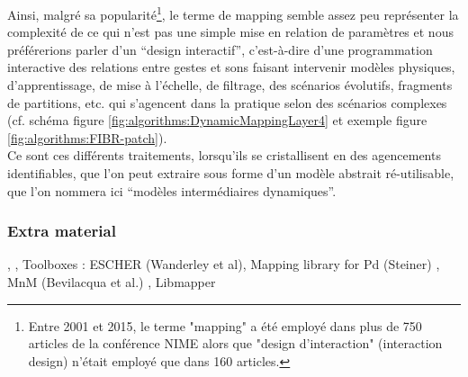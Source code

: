 \indent Ainsi, malgré sa popularité\footnote{Entre 2001 et 2015, le terme "mapping" a été employé dans plus de 750 articles de la conférence \gls{NIME} alors que "design d'interaction" (interaction design) n'était employé que dans 160 articles.}, le terme de mapping semble assez peu représenter la complexité de ce qui n'est pas une simple mise en relation de paramètres et nous préférerions parler d'un ``design interactif'', c'est-à-dire d'une programmation interactive des relations entre gestes et sons faisant intervenir modèles physiques, d'apprentissage, de mise à l'échelle, de filtrage, des scénarios évolutifs, fragments de partitions, etc. qui s'agencent dans la pratique selon des scénarios complexes (cf. schéma figure \ref{fig:algorithms:DynamicMappingLayer4} et exemple figure \ref{fig:algorithms:FIBR-patch}).\\
\noindent Ce sont ces différents traitements, lorsqu'ils se cristallisent en des agencements identifiables, que l'on peut extraire sous forme d'un modèle abstrait ré-utilisable, que l'on nommera ici ``modèles intermédiaires dynamiques''.

\subsubsection{Extra material}

\cite{momeni_dynamic_2006}, \cite{winkler_making_1995}, 
Toolboxes : ESCHER (Wanderley et al)\cite{wanderley_escher-modeling_1998}, Mapping library for Pd (Steiner) \cite{steiner_towards_2006}, MnM (Bevilacqua et al.) \cite{bevilacqua_mnm_2005}, Libmapper

